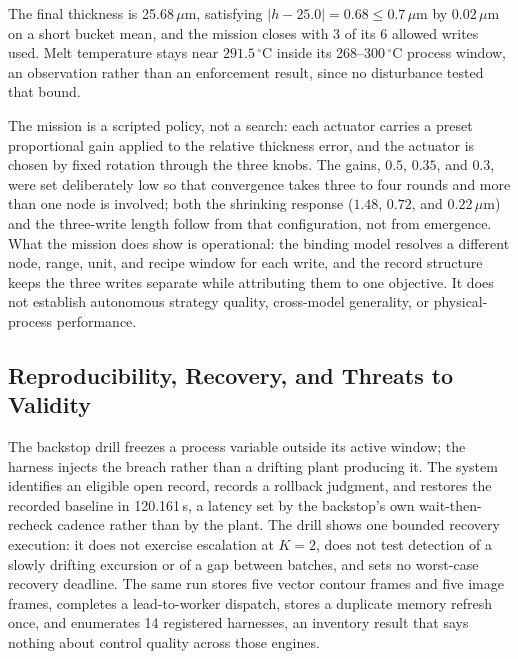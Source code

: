 The final thickness is 25.68\,$\mu$m, satisfying $|h-25.0|=0.68\leq0.7\,\mu$m by
$0.02\,\mu$m on a short bucket mean, and the mission closes with 3 of its 6 allowed
writes used. Melt temperature stays near $291.5\,^\circ$C inside its
268--300\,$^\circ$C process window, an observation rather than an enforcement
result, since no disturbance tested that bound.

The mission is a scripted policy, not a search: each actuator carries a preset
proportional gain applied to the relative thickness error, and the actuator is chosen
by fixed rotation through the three knobs. The gains, $0.5$, $0.35$, and $0.3$, were
set deliberately low so that convergence takes three to four rounds and more than one
node is involved; both the shrinking response ($1.48$, $0.72$, and $0.22\,\mu$m) and
the three-write length follow from that configuration, not from emergence. What the
mission does show is operational: the binding model resolves a different node,
range, unit, and recipe window for each write, and the record structure keeps the
three writes separate while attributing them to one objective. It does not establish
autonomous strategy quality, cross-model generality, or physical-process
performance.

\subsection{Reproducibility, Recovery, and Threats to Validity}
\label{sec:e1a}
\label{sec:repro}
The backstop drill freezes a process variable outside its active window; the harness
injects the breach rather than a drifting plant producing it. The system identifies
an eligible open record, records a rollback judgment, and restores the recorded
baseline in 120.161\,s, a latency set by the backstop's own wait-then-recheck cadence
rather than by the plant. The drill shows one bounded recovery execution: it does
not exercise escalation at $K=2$, does not test detection of a slowly drifting
excursion or of a gap between batches, and sets no worst-case recovery deadline. The
same run stores five vector contour frames and five image frames, completes a
lead-to-worker dispatch, stores a duplicate memory refresh once, and enumerates 14 registered
harnesses, an inventory result that says nothing about control quality across those
engines.

